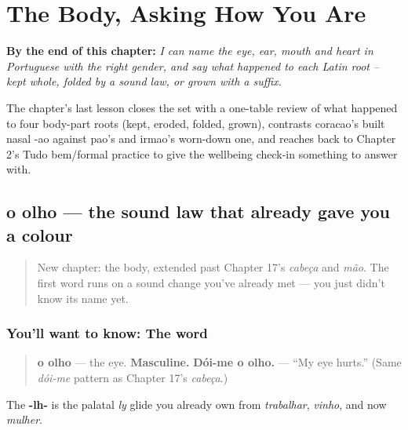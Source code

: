 
\chapter{The Body, Asking How You Are}
\label{ch:pt-body-how-are-you}

\begin{chapteropening}
\textbf{By the end of this chapter:} \emph{I can name the eye, ear, mouth and heart in Portuguese with the right gender, and say what happened to each Latin root -- kept whole, folded by a sound law, or grown with a suffix.}

The chapter's last lesson closes the set with a one-table review of what happened to four body-part roots (kept, eroded, folded, grown), contrasts coracao's built nasal -ao against pao's and irmao's worn-down one, and reaches back to Chapter 2's Tudo bem/formal practice to give the wellbeing check-in something to answer with.
\end{chapteropening}

\section[o olho]{o olho — the sound law that already gave you a colour}

\label{lesson:PT-C26-olho}



\begin{quote}
New chapter: the body, extended past Chapter 17's \emph{cabeça} and \emph{mão}. The first word runs on a sound change you've already met — you just didn't know its name yet.
\end{quote}

\subsection*{You'll want to know: The word}
\begin{quote}
\textbf{o olho} — the eye. \textbf{Masculine.} \textbf{Dói-me o olho.} — \textquotedblleft{}My eye hurts.\textquotedblright{} (Same \emph{dói-me} pattern as Chapter 17's \emph{cabeça}.)
\end{quote}

The \textbf{-lh-} is the palatal \emph{ly} glide you already own from \emph{trabalhar}, \emph{vinho}, and now \emph{mulher}.

